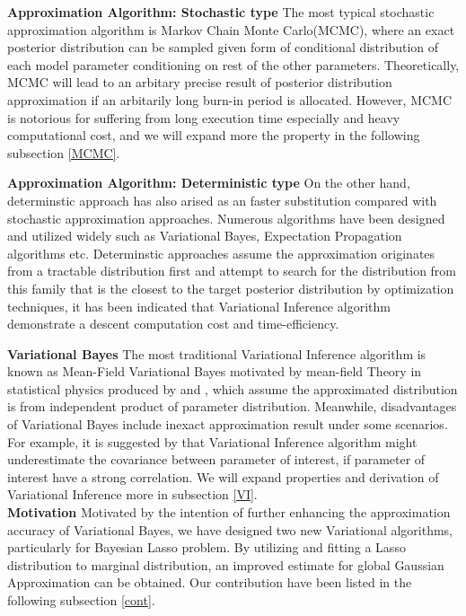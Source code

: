 \textbf{Approximation Algorithm: Stochastic type}
The most typical stochastic approximation algorithm is Markov Chain Monte Carlo(MCMC), where an exact posterior distribution can be sampled given form of conditional distribution of each model parameter conditioning on rest of the other parameters. Theoretically, MCMC will lead to an arbitary precise result of posterior distribution approximation if an arbitarily long burn-in period is allocated. However, MCMC is notorious for suffering from long execution time especially and heavy computational cost, and we will expand more the property in the following subsection \ref{MCMC}.

\textbf{Approximation Algorithm: Deterministic type}
On the other hand, determinstic approach has also arised as an faster substitution compared with stochastic approximation approaches. Numerous algorithms have been designed and utilized widely such as Variational Bayes, Expectation Propagation algorithms etc. Determinstic approaches assume the approximation originates from a tractable distribution first and attempt to search for the distribution from this family that is the closest to the target posterior distribution by optimization techniques, it has been indicated that Variational Inference algorithm demonstrate a descent computation cost and time-efficiency. 

\textbf{Variational Bayes}
The most traditional Variational Inference algorithm is known as Mean-Field Variational Bayes motivated by mean-field Theory in statistical physics produced by 
\cite{jordan_ghahramani_jaakkola_saul_1998} and \cite{attias_1999}, which assume the approximated distribution is from independent product of parameter distribution.
Meanwhile, disadvantages of Variational Bayes include inexact approximation result under some scenarios. For example, it is suggested by \cite{bishop_2006} that Variational Inference algorithm might underestimate the covariance between parameter of interest, if parameter of interest have a strong correlation. We will expand properties and derivation of Variational Inference more in subsection \ref{VI}.\\

\textbf{Motivation}
Motivated by the intention of further enhancing the approximation accuracy of Variational Bayes, we have designed two new Variational algorithms, particularly for Bayesian Lasso problem. By utilizing and fitting a Lasso distribution to marginal distribution, an improved estimate for global Gaussian Approximation can be obtained. Our contribution have been listed in the following subsection \ref{cont}.\\

